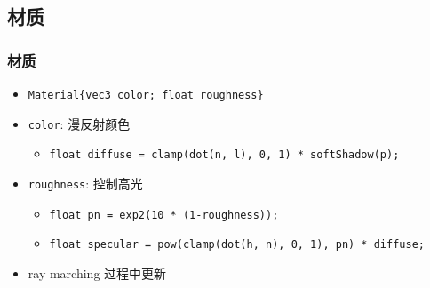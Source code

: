 \documentclass[aspectratio=169]{ctexbeamer} %
\begin{document}
\subsection{材质}
\begin{frame}
    \frametitle{材质}
    \begin{itemize}
        \item \texttt{Material\{vec3 color; float roughness\}}
        \item \texttt{color}: 漫反射颜色
        \begin{itemize}
            \item \texttt{float diffuse = clamp(dot(n, l), 0, 1) * softShadow(p);}
        \end{itemize}
        \item \texttt{roughness}: 控制高光
        \begin{itemize}
            \item \texttt{float pn = exp2(10 * (1-roughness));}
            \item \texttt{float specular = pow(clamp(dot(h, n), 0, 1), pn) * diffuse;}
        \end{itemize}
        \item ray marching 过程中更新
    \end{itemize}
\end{frame}
\end{document}
